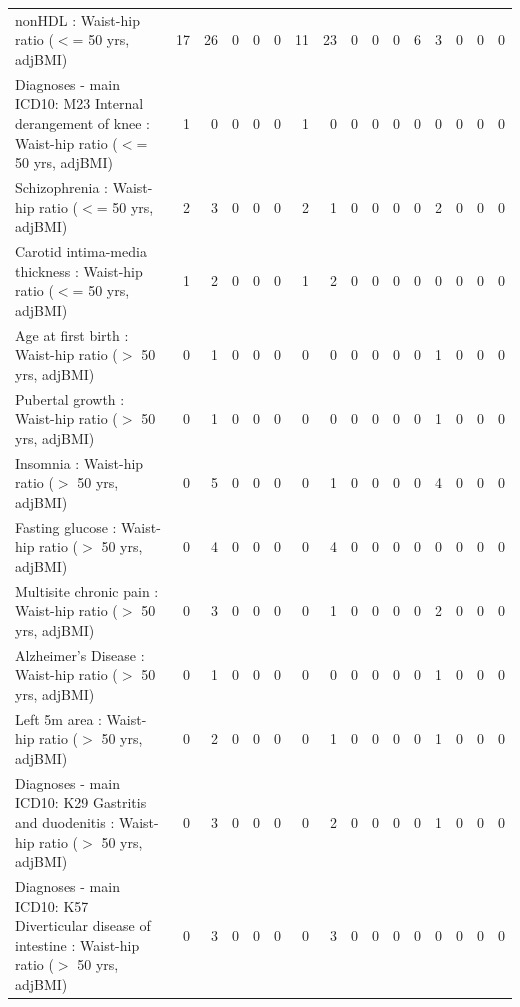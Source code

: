 \begin{table}[ht]
\begin{tabular}{lrrrrrrrrrrrrrrr}
  nonHDL : Waist-hip ratio ($<$= 50 yrs, adjBMI) &  17 &  26 &   0 &   0 &   0 &  11 &  23 &   0 &   0 &   0 &   6 &   3 &   0 &   0 &   0 \\ 
  Diagnoses - main ICD10: M23 Internal derangement of knee : Waist-hip ratio ($<$= 50 yrs, adjBMI) &   1 &   0 &   0 &   0 &   0 &   1 &   0 &   0 &   0 &   0 &   0 &   0 &   0 &   0 &   0 \\ 
  Schizophrenia : Waist-hip ratio ($<$= 50 yrs, adjBMI) &   2 &   3 &   0 &   0 &   0 &   2 &   1 &   0 &   0 &   0 &   0 &   2 &   0 &   0 &   0 \\ 
  Carotid intima-media thickness : Waist-hip ratio ($<$= 50 yrs, adjBMI) &   1 &   2 &   0 &   0 &   0 &   1 &   2 &   0 &   0 &   0 &   0 &   0 &   0 &   0 &   0 \\ 
  Age at first birth  : Waist-hip ratio ($>$ 50 yrs, adjBMI) &   0 &   1 &   0 &   0 &   0 &   0 &   0 &   0 &   0 &   0 &   0 &   1 &   0 &   0 &   0 \\ 
  Pubertal growth  : Waist-hip ratio ($>$ 50 yrs, adjBMI) &   0 &   1 &   0 &   0 &   0 &   0 &   0 &   0 &   0 &   0 &   0 &   1 &   0 &   0 &   0 \\ 
  Insomnia : Waist-hip ratio ($>$ 50 yrs, adjBMI) &   0 &   5 &   0 &   0 &   0 &   0 &   1 &   0 &   0 &   0 &   0 &   4 &   0 &   0 &   0 \\ 
  Fasting glucose : Waist-hip ratio ($>$ 50 yrs, adjBMI) &   0 &   4 &   0 &   0 &   0 &   0 &   4 &   0 &   0 &   0 &   0 &   0 &   0 &   0 &   0 \\ 
  Multisite chronic pain : Waist-hip ratio ($>$ 50 yrs, adjBMI) &   0 &   3 &   0 &   0 &   0 &   0 &   1 &   0 &   0 &   0 &   0 &   2 &   0 &   0 &   0 \\ 
  Alzheimer's Disease : Waist-hip ratio ($>$ 50 yrs, adjBMI) &   0 &   1 &   0 &   0 &   0 &   0 &   0 &   0 &   0 &   0 &   0 &   1 &   0 &   0 &   0 \\ 
  Left 5m area : Waist-hip ratio ($>$ 50 yrs, adjBMI) &   0 &   2 &   0 &   0 &   0 &   0 &   1 &   0 &   0 &   0 &   0 &   1 &   0 &   0 &   0 \\ 
  Diagnoses - main ICD10: K29 Gastritis and duodenitis : Waist-hip ratio ($>$ 50 yrs, adjBMI) &   0 &   3 &   0 &   0 &   0 &   0 &   2 &   0 &   0 &   0 &   0 &   1 &   0 &   0 &   0 \\ 
  Diagnoses - main ICD10: K57 Diverticular disease of intestine : Waist-hip ratio ($>$ 50 yrs, adjBMI) &   0 &   3 &   0 &   0 &   0 &   0 &   3 &   0 &   0 &   0 &   0 &   0 &   0 &   0 &   0 \\ 

\end{tabular}
\end{table}
